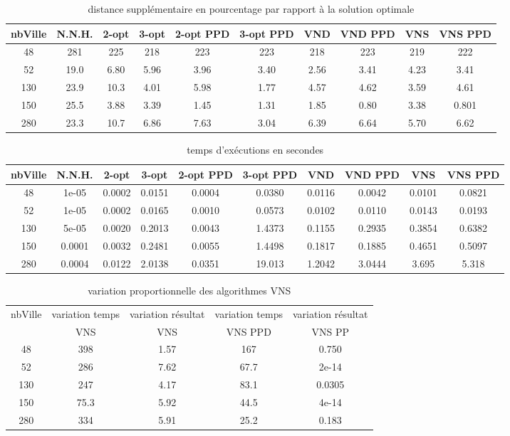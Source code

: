 \documentclass[12pt,a4paper]{article}
\begin{document}
\begin{table}[!h]
\leftskip -1cm
{
\begin{tabular}{|*{10}{c|}}
  \hline
  nbVille & N.N.H. & 2-opt & 3-opt & 2-opt PPD & 3-opt PPD & VND & VND PPD & VNS & VNS PPD \\
  \hline
  48 & 281 & 225 & 218 & 223 & 223 & 218 & 223 & 219 & 222 \\
  52 & 19.0 & 6.80 & 5.96 & 3.96 & 3.40 & 2.56 & 3.41 & 4.23 & 3.41 \\
  130 & 23.9 & 10.3 & 4.01 & 5.98 & 1.77 & 4.57 & 4.62 & 3.59 & 4.61 \\
  150 & 25.5 & 3.88 & 3.39 & 1.45 & 1.31 & 1.85 & 0.80 & 3.38 & 0.801 \\
  280 & 23.3 & 10.7 & 6.86 & 7.63 & 3.04 & 6.39 & 6.64 & 5.70 & 6.62 \\
  \hline
\end{tabular}
}
\caption{distance supplémentaire en pourcentage par rapport à la solution optimale}
\label{NNHpourcentageperf}
\end{table}

\begin{table}[!h]
\leftskip -1.4cm
{
\begin{tabular}{|*{10}{c|}}
  \hline
  nbVille & N.N.H. & 2-opt & 3-opt & 2-opt PPD & 3-opt PPD & VND & VND PPD & VNS & VNS PPD \\
  \hline
  48 & 1e-05 & 0.0002 & 0.0151 & 0.0004 & 0.0380 & 0.0116 & 0.0042 & 0.0101 & 0.0821 \\
  52 & 1e-05 & 0.0002 & 0.0165 & 0.0010 & 0.0573 & 0.0102 & 0.0110 & 0.0143 & 0.0193 \\
  130 & 5e-05 & 0.0020 & 0.2013 & 0.0043 & 1.4373 & 0.1155 & 0.2935 & 0.3854 & 0.6382 \\
  150 & 0.0001 & 0.0032 & 0.2481 & 0.0055 & 1.4498 & 0.1817 & 0.1885 & 0.4651 & 0.5097 \\
  280 & 0.0004 & 0.0122 & 2.0138 & 0.0351 & 19.013 & 1.2042 & 3.0444 & 3.695 & 5.318 \\ 
  \hline
\end{tabular}
}
\caption{temps d’exécutions en secondes}
\label{NNHtemps}
\end{table}

\begin{table}[!h]
\centering
\begin{tabular}{|*{5}{c|}}
  \hline
  nbVille & variation temps & variation résultat & variation temps & variation résultat \\
  ~ & VNS & VNS & VNS PPD & VNS PP \\
  \hline
  48 & 398 & 1.57 & 167 & 0.750 \\ 
  52 & 286 & 7.62 & 67.7 & 2e-14 \\
  130 & 247 & 4.17 & 83.1 & 0.0305 \\
  150 & 75.3 & 5.92 & 44.5 & 4e-14 \\
  280 & 334 & 5.91 & 25.2 & 0.183 \\
  \hline
\end{tabular}
\caption{variation proportionnelle des algorithmes VNS}
\label{variationVNSNNH}
\end{table}
\end{document}
